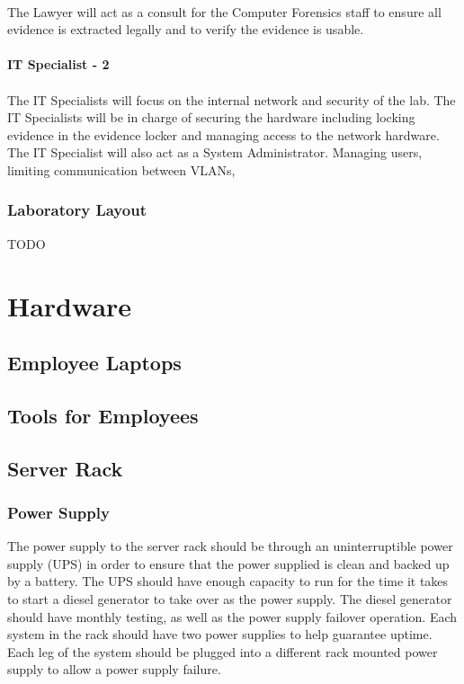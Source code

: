 \documentclass{article}
\begin{document}
\paragraph{} The Lawyer will act as a consult for the Computer Forensics staff to ensure all evidence is extracted legally and to verify the evidence is usable.

\paragraph{IT Specialist - 2}
\paragraph{} The IT Specialists will focus on the internal network and security of the lab.  The IT Specialists will be in charge of securing the hardware including locking evidence in the evidence locker and managing access to the network hardware. The IT Specialist will also act as a System Administrator.  Managing users, limiting communication between VLANs,
\subsubsection{Laboratory Layout}
TODO


\section{Hardware}
\subsection{Employee Laptops} 
\subsection{Tools for Employees} 
\subsection{Server Rack}
\subsubsection{Power Supply} The power supply to the server rack should be through an uninterruptible power supply (UPS) in order to ensure that the power supplied is clean and backed up by a battery. The UPS should have enough capacity to run for the time it takes to start a diesel generator to take over as the power supply. The diesel generator should have monthly testing, as well as the power supply failover operation. Each system in the rack should have two power supplies to help guarantee uptime. Each leg of the system should be plugged into a different rack mounted power supply to allow a power supply failure. 
\end{document}
